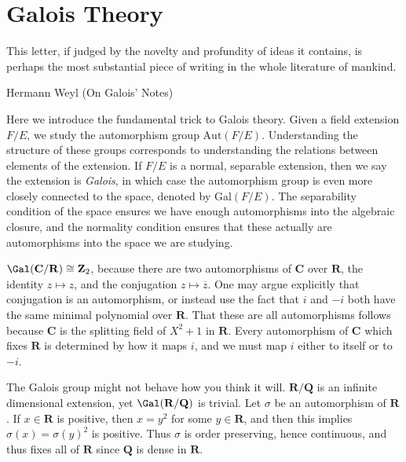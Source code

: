 \chapter{Galois Theory}

\epigraph{This letter, if judged by the novelty and profundity of ideas it contains, is perhaps the most substantial piece of writing in the whole literature of mankind.}{Hermann Weyl (On Galois' Notes)}

Here we introduce the fundamental trick to Galois theory. Given a field extension $F/E$, we study the automorphism group $\text{Aut}(F/E)$. Understanding the structure of these groups corresponds to understanding the relations between elements of the extension. If $F/E$ is a normal, separable extension, then we say the extension is \emph{Galois}, in which case the automorphism group is even more closely connected to the space, denoted by $\text{Gal}(F/E)$. The separability condition of the space ensures we have enough automorphisms into the algebraic closure, and the normality condition ensures that these actually are automorphisms into the space we are studying.

\begin{example}
    $\Gal(\mathbf{C}/\mathbf{R}) \cong \mathbf{Z}_2$, because there are two automorphisms of $\mathbf{C}$ over $\mathbf{R}$, the identity $z \mapsto z$, and the conjugation $z \mapsto \overline{z}$. One may argue explicitly that conjugation is an automorphism, or instead use the fact that $i$ and $-i$ both have the same minimal polynomial over $\mathbf{R}$. That these are all automorphisms follows because $\mathbf{C}$ is the splitting field of $X^2 + 1$ in $\mathbf{R}$. Every automorphism of $\mathbf{C}$ which fixes $\mathbf{R}$ is determined by how it maps $i$, and we must map $i$ either to itself or to $-i$.
\end{example}

\begin{example}
    The Galois group might not behave how you think it will. $\mathbf{R}/\mathbf{Q}$ is an infinite dimensional extension, yet $\Gal(\mathbf{R}/\mathbf{Q})$ is trivial. Let $\sigma$ be an automorphism of $\mathbf{R}$. If $x \in \mathbf{R}$ is positive, then $x = y^2$ for some $y \in \mathbf{R}$, and then this implies $\sigma(x) = \sigma(y)^2$ is positive. Thus $\sigma$ is order preserving, hence continuous, and thus fixes all of $\mathbf{R}$ since $\mathbf{Q}$ is dense in $\mathbf{R}$.
\end{example}

